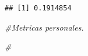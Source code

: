 \documentclass[
]{article}
\newenvironment{Shaded}{\begin{snugshade}}{\end{snugshade}}
\newcommand{\CommentTok}[1]{\textcolor[rgb]{0.56,0.35,0.01}{\textit{#1}}}
\begin{document}
\begin{verbatim}
## [1] 0.1914854
\end{verbatim}

\begin{Shaded}
\begin{Highlighting}[]
\CommentTok{\#Metricas personales.}

\CommentTok{\#}
\end{Highlighting}
\end{Shaded}
\end{document}
